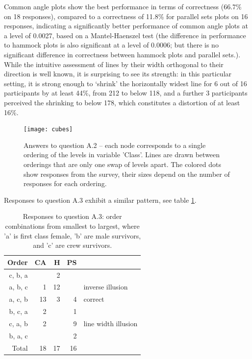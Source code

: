 %
Common angle plots show the best performance in terms of correctness (66.7\% on 18 responses), compared to a correctness of 11.8\% for parallel sets plots on 16 responses, indicating a significantly better performance of common angle plots at a level of 0.0027, based on a Mantel-Haenszel test (the difference in performance to hammock plots is also significant at a level of 0.0006; but there is no significant difference in correctness between hammock plots and parallel sets.).
While the intuitive assessment of lines by their width orthogonal to their direction is well known, it is surprising to see its strength: in this particular setting, it is strong enough to `shrink' the horizontally widest line for 6 out of 16 participants by at least  44\%, from 212 to below 118, and a further 3 participants perceived the shrinking to below 178, which constitutes a distortion of at least 16\%.

\begin{figure}
\texttt{[image: cubes]}
\caption{Answers to question A.2 -- each node corresponds to a single ordering of the levels in variable 'Class'. Lines are drawn between orderings that are only one swap of levels apart. The colored dots show responses from the survey, their sizes depend on the number of responses for each ordering. }
\label{cubes}
\end{figure}

Responses to question A.3 exhibit a similar pattern, see table \ref{a3}.

\begin{table}[ht]
\begin{center}
\begin{tabular}{rrrrl}
Order & CA & H & PS\\
  \hline
c, b, a &  &  2 &  \\
a, b, c &  1 &  12 &  & inverse illusion\\ 
a, c, b & 13 &  3 &  4 & correct\\ 
b, c, a &  2 &  &  1 \\ 
c, a, b &  2 &  & 9 & line width illusion\\ 
b, a, c &  &  &  2 \\ 
 \hline
  Total & 18 &  17 & 16 \\ 
   \hline
\end{tabular}
\end{center}
\caption{\label{a3}Responses to question A.3: order combinations from smallest to largest, where 'a' is first class female, 'b' are male survivors, and 'c' are crew survivors. }
\end{table}
  
